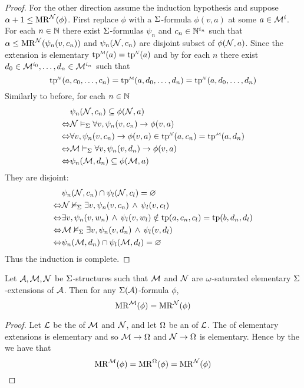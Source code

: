 \begin{proof}
    For the other direction assume the induction hypothesis and suppose 
    $\al + 1 \leq \MR{\NN}{\phi}$.
    First replace $\phi$ with a $\Si$-formula $\phi(v,a)$ at some 
    $a \in \MM^{i}$.
    For each $n \in \N$
    there exist $\Si$-formulas $\psi_n$ and $c_n \in \N^{i_n}$
    such that $\al \leq \MR{\NN}{\psi_n(v,c_n)}$ and $\psi_n(\NN, c_n)$
    are disjoint subset of $\phi(\NN,a)$.
    Since the extension is elementary $\mmintp{\tp}(a) = \nnintp{\tp}(a)$
    and by  for each $n$
    there exist $d_0 \in \MM^{i_0},\dots,d_n \in \MM^{i_n}$ such that 
    \[
        \nnintp{\tp}(a,c_0,\dots,c_n) = \mmintp{\tp}(a,d_0,\dots,d_n)
        = \nnintp{\tp}(a, d_0,\dots,d_n)
    \]
    Similarly to before, for each $n \in \N$
    \begin{align*}
        &\psi_n(\NN,c_n) \subs \phi(\NN,a)\\
        \iff & \NN \model{\Si} \forall v, \psi_n(v,c_n) \to \phi(v,a)\\
        \iff & \forall v, \psi_n(v,c_n) \to \phi(v,a) \in 
        \nnintp{\tp}(a,c_n) = \mmintp{\tp}(a,d_n)\\
        \iff & \MM \model{\Si} \forall v, \psi_n(v,d_n) \to \phi(v,a)\\
        \iff & \psi_n(\MM,d_n) \subs \phi(\MM,a)
    \end{align*}
    They are disjoint:
    \begin{align*}
        &\psi_n(\NN,c_n) \cap \psi_l(\NN,c_l) = \nothing\\
        \iff & \NN \nodel{\Si} \exists v, \psi_n(v,c_n) \AND \psi_l(v,c_l)\\
        \iff & \exists v, \psi_n(v,w_n) \AND \psi_l(v,w_l) \notin 
        \tp(a,c_n,c_l) = 
        \tp(b,d_n,d_l)\\
        \iff & \MM \nodel{\Si} \exists v, \psi_n(v,d_n) \AND \psi_l(v,d_l)\\
        \iff & \psi_n(\MM,d_n) \cap \psi_l(\MM,d_l) = \nothing
    \end{align*}
    Thus the induction is complete.
\end{proof}

\begin{cor}
    Let $\AA,\MM,\NN$ be $\Si$-structures such that $\MM$ and $\NN$ are 
    $\om$-saturated elementary $\Si$-extensions of $\AA$. 
    Then for any $\Si(\AA)$-formula $\phi$, 
    \[\MR{\MM}{\phi} = \MR{\NN}{\phi}\]
\end{cor}
\begin{proof}
    Let $\LL$ be the  of $\MM$ and $\NN$,
    and let $\Om$ be an 
    of $\LL$.
    The  
    of elementary extensions is elementary and so 
    $\MM \to \Om$ and $\NN \to \Om$ is elementary.
    Hence by the 
    we have that 
    \[\MR{\MM}{\phi} = \MR{\Om}{\phi} = \MR{\NN}{\phi}\]
\end{proof}

